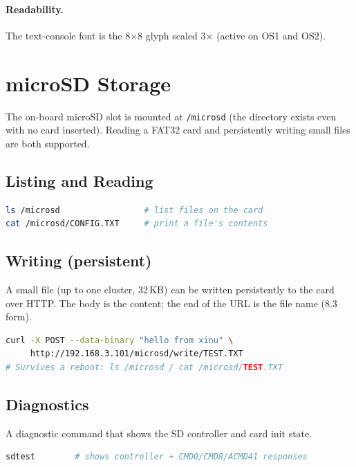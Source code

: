 \documentclass[a4paper,11pt]{article}
\begin{document}
\paragraph{Readability.} The text-console font is the 8$\times$8 glyph scaled
3$\times$ (active on OS1 and OS2).

\section{microSD Storage}
\label{sec:storage}

The on-board microSD slot is mounted at \texttt{/microsd} (the directory
exists even with no card inserted). Reading a FAT32 card and persistently
writing small files are both supported.

\subsection{Listing and Reading}
\begin{lstlisting}[language=bash]
ls /microsd                 # list files on the card
cat /microsd/CONFIG.TXT     # print a file's contents
\end{lstlisting}

\subsection{Writing (persistent)}
A small file (up to one cluster, 32\,KB) can be written persistently to the
card over HTTP. The body is the content; the end of the URL is the file name
(8.3 form).

\begin{lstlisting}[language=bash]
curl -X POST --data-binary "hello from xinu" \
     http://192.168.3.101/microsd/write/TEST.TXT
# Survives a reboot: ls /microsd / cat /microsd/TEST.TXT
\end{lstlisting}

\subsection{Diagnostics}
A diagnostic command that shows the SD controller and card init state.
\begin{lstlisting}[language=bash]
sdtest        # shows controller + CMD0/CMD8/ACMD41 responses
\end{lstlisting}

\end{document}

